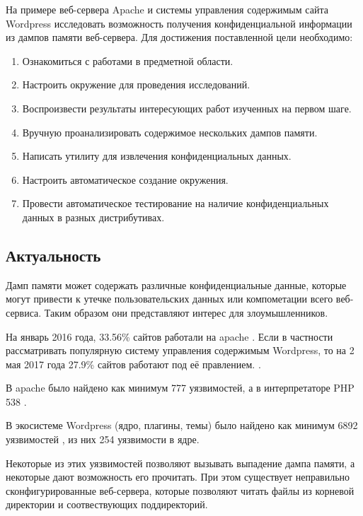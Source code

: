 \documentclass[20pt]{article}
\begin{document}
На примере веб-сервера Apache и системы управления содержимым сайта Wordpress
исследовать возможность получения конфиденциальной информации из дампов памяти
веб-сервера. Для достижения поставленной цели необходимо:

\begin{enumerate}
  \item Ознакомиться с работами в предметной области.
  \item Настроить окружение для проведения исследований.
  \item Воспроизвести результаты интересующих работ изученных на первом шаге.
  \item Вручную проанализировать содержимое нескольких дампов памяти.
  \item Написать утилиту для извлечения конфиденциальных данных.
  \item Настроить автоматическое создание окружения.
  \item Провести автоматическое тестирование на наличие конфиденциальных данных
  в разных дистрибутивах.
\end{enumerate}

\newpage

\subsection{Актуальность}

Дамп памяти может содержать различные конфиденциальные данные, которые могут
привести к утечке пользовательских данных или компометации всего веб-сервиса.
Таким образом они представляют интерес для злоумышленников.

На январь 2016 года, 33.56\% сайтов работали на apache \cite{number_of_apache_sites}.
Если в частности рассматривать популярную систему управления содержимым Wordpress,
то на 2 мая 2017 года 27.9\% сайтов работают под её правлением. \cite{number_of_wordpress_sites}.

В apache было найдено как минимум 777 \cite{apache/vulnerabilities-list} уязвимостей,
а в интерпретаторе PHP 538 \cite{php/vulnerabilities-list}.

В экосистеме Wordpress (ядро, плагины, темы) было найдено как минимум 6892
уязвимостей \cite{wordpress/vulnerablilities-list-all}, из них 254
уязвимости \cite{wordpress/vulnerabilities-list-core} в ядре.

Некоторые из этих уязвимостей позволяют вызывать выпадение дампа памяти, а
некоторые дают возможность его прочитать. При этом существует неправильно
сконфигурированные веб-сервера, которые позволяют читать файлы из корневой
директории и соотвествующих поддиректорий.
\end{document}
